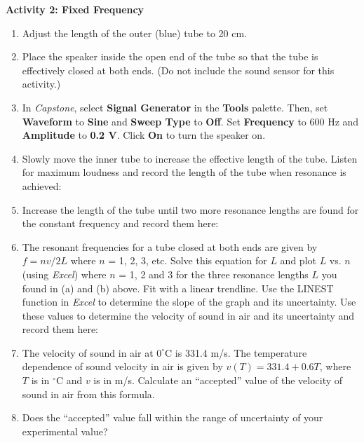 \textbf{Activity 2: Fixed Frequency} 
\begin{enumerate}[labparts]

\item Adjust the length of the outer (blue) tube to 20 cm.

\item Place the speaker inside the open end of the tube so that the tube is effectively closed at both ends. (Do not include the sound sensor for this activity.)

\item In \textit{Capstone}, select \textbf{Signal Generator} in the \textbf{Tools} palette. Then, set \textbf{Waveform} to \textbf{Sine} and \textbf{Sweep Type} to \textbf{Off}. Set \textbf{Frequency} to 600 Hz and \textbf{Amplitude} to \textbf{0.2 V}. Click \textbf{On} to turn the speaker on.

\item Slowly move the inner tube to increase the effective length of the tube. Listen for maximum loudness and record the length of the tube when resonance is achieved:
\vspace{10mm}

\item Increase the length of the tube until two more resonance lengths are found for the constant frequency and record them here:
\vspace{10mm}


\item The resonant frequencies for a tube closed at both ends are given by 
$f=nv/2L$ where $n$ = 1, 2, 3, etc. Solve this equation for $L$ and plot $L$ 
vs. $n$ (using \textit{Excel}) where $n$ = 1, 2 and 3 for the three resonance lengths $L$
you found in (a) and (b) above. Fit with a linear trendline. Use the LINEST function in \textit{Excel} to determine the slope of the graph and its uncertainty. Use these values to determine the velocity of sound in air and its uncertainty and record them here:
\vspace{20mm}

\item The velocity of sound in air at $0^\circ$C is 331.4 m/s.  The temperature dependence of sound velocity in air is given by $v(T) = 331.4 + 0.6T$, where $T$ is in $^\circ$C and $v$ is in m/s. Calculate an ``accepted'' value of the velocity of sound in air from this formula.
\vspace{20mm}

\item Does the ``accepted'' value fall within the range of uncertainty of your experimental value?
\answerspace{5mm}
\end{enumerate}
